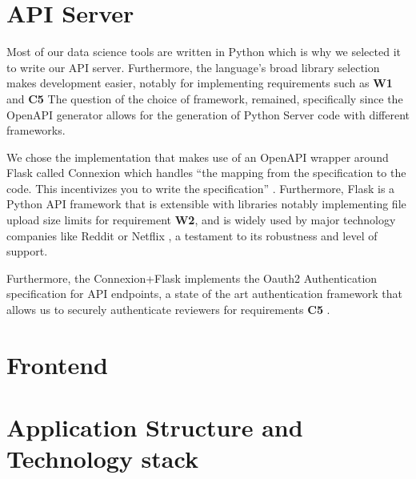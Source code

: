 \documentclass{l4proj}
\begin{document}
\section{API Server}

Most of our data science tools are written in Python which is why we selected it to write our API server.
Furthermore, the language's broad library selection makes development easier, notably for implementing requirements such as \textbf{W1} and \textbf{C5}
The question of the choice of framework, remained, specifically since the OpenAPI generator allows for the generation of Python Server code with different frameworks.

We chose the implementation that makes use of an OpenAPI wrapper around Flask called Connexion which handles ``the mapping from the specification to the code.
This incentivizes you to write the specification'' \autocite{ZalandoConnexion2020}.
Furthermore, Flask is a Python API framework that is extensible with libraries notably implementing file upload size limits for requirement \textbf{W2}, and is widely used by major technology companies like Reddit or Netflix \autocite{WhyDevelopersFlask}, a testament to its robustness and level of support.

Furthermore, the Connexion+Flask implements the Oauth2 Authentication specification for API endpoints, a state of the art authentication framework that allows us to securely authenticate reviewers for requirements \textbf{C5} \autocite{jonesOAuthAuthorizationFramework2012}.

\section{Frontend}


\section{Application Structure and Technology stack}
\end{document}

